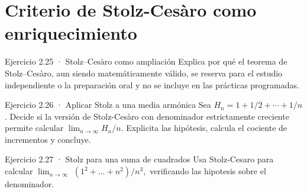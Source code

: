 \documentclass[10pt,a4paper,oneside,openany]{book}
\begin{document}
\section{Criterio de Stolz-Cesàro como enriquecimiento}
\begin{PSevenExerciseFixed}{Ejercicio 2.25 · Stolz–Cesàro como ampliación}
Explica por qué el teorema de Stolz–Cesàro, aun siendo matemáticamente válido, se reserva para el estudio independiente o la preparación oral y no se incluye en las prácticas programadas.
\end{PSevenExerciseFixed}
\begin{PSevenExerciseFixed}{Ejercicio 2.26 · Aplicar Stolz a una media armónica}
Sea \(H_n=1+1/2+\cdots+1/n\). Decide si la versión de Stolz-Cesàro con denominador estrictamente creciente permite calcular \(\lim_{n\to\infty}H_n/n\). Explicita las hipótesis, calcula el cociente de incrementos y concluye.
\end{PSevenExerciseFixed}
\begin{PSevenExerciseFixed}{Ejercicio 2.27 · Stolz para una suma de cuadrados}
Usa Stolz-Cesaro para calcular \(\lim_{n\to \infty }\) \((1^{2}+\ldots +n^{2})/n^{3},\) verificando las hipotesis sobre el denominador.
\end{PSevenExerciseFixed}
\end{document}

